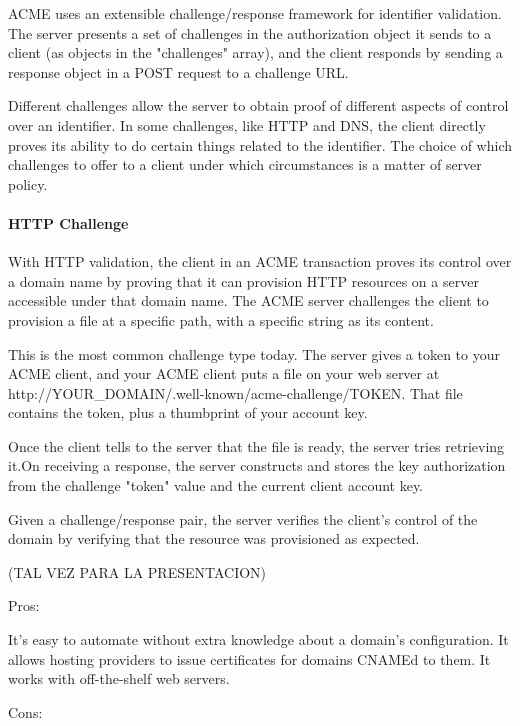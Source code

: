 ACME uses an extensible challenge/response framework for identifier
validation.  The server presents a set of challenges in the
authorization object it sends to a client (as objects in the
"challenges" array), and the client responds by sending a response
object in a POST request to a challenge URL.

   Different challenges allow the server to obtain proof of different
   aspects of control over an identifier.  In some challenges, like HTTP
   and DNS, the client directly proves its ability to do certain things
   related to the identifier.  The choice of which challenges to offer
   to a client under which circumstances is a matter of server policy.


   

\paragraph*{HTTP Challenge}

   With HTTP validation, the client in an ACME transaction proves its
   control over a domain name by proving that it can provision HTTP
   resources on a server accessible under that domain name.  The ACME
   server challenges the client to provision a file at a specific path,
   with a specific string as its content.

   This is the most common challenge type today. The server gives a
   token to your ACME client, and your ACME client puts a file on your web 
   server at {http://\<YOUR\_DOMAIN\>/.well-known/acme-challenge/\<TOKEN\>}. That 
   file contains the token, plus a thumbprint of your account key. 

   Once the client tells to the server that the file is ready, the server 
   tries retrieving it.On receiving a response, the server constructs and stores the key
   authorization from the challenge "token" value and the current client
   account key.

   Given a challenge/response pair, the server verifies the client's
   control of the domain by verifying that the resource was provisioned
   as expected.

   (TAL VEZ PARA LA PRESENTACION)

   Pros:

    It’s easy to automate without extra knowledge about a domain’s configuration.
    It allows hosting providers to issue certificates for domains CNAMEd to them.
    It works with off-the-shelf web servers.

   Cons:

